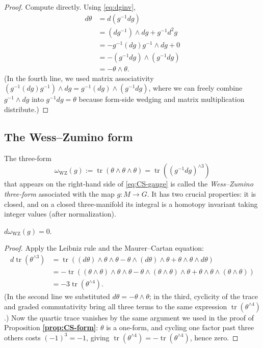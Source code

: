 \documentclass[11pt]{article}
\newcommand{\tr}{\operatorname{tr}}
\theoremstyle{definition}
\numberwithin{theorem}{section}
\numberwithin{equation}{section}
\begin{document}
\begin{proof}
Compute directly. Using \eqref{eq:dginv},
\begin{align*}
d\theta &= d(g^{-1}dg) \\
&= (dg^{-1})\wedge dg + g^{-1}d^2g \\
&= -g^{-1}(dg)g^{-1}\wedge dg + 0 \\
&= -(g^{-1}dg)\wedge(g^{-1}dg) \\
&= -\theta\wedge\theta.
\end{align*}
(In the fourth line, we used matrix associativity $(g^{-1}(dg)g^{-1})\wedge dg = g^{-1}(dg)\wedge(g^{-1}dg)$, where we can freely combine $g^{-1}\wedge dg$ into $g^{-1}dg = \theta$ because form-side wedging and matrix multiplication distribute.)
\end{proof}

\subsection{The Wess--Zumino form}

The three-form
\begin{equation}\label{eq:WZ-form}
\omega_{\text{WZ}}(g) := \tr(\theta\wedge\theta\wedge\theta) = \tr\left((g^{-1}dg)^{\wedge 3}\right)
\end{equation}
that appears on the right-hand side of \eqref{eq:CS-gauge} is called the \emph{Wess--Zumino three-form} associated with the map $g:M\to G$. It has two crucial properties: it is closed, and on a closed three-manifold its integral is a homotopy invariant taking integer values (after normalization).

\begin{lemma}\label{lem:WZ-closed}
$d\omega_{\text{WZ}}(g) = 0$.
\end{lemma}

\begin{proof}
Apply the Leibniz rule and the Maurer--Cartan equation:
\begin{align*}
d\tr(\theta^{\wedge 3}) &= \tr\left((d\theta)\wedge\theta\wedge\theta - \theta\wedge(d\theta)\wedge\theta + \theta\wedge\theta\wedge d\theta\right) \\
&= -\tr\left((\theta\wedge\theta)\wedge\theta\wedge\theta - \theta\wedge(\theta\wedge\theta)\wedge\theta + \theta\wedge\theta\wedge(\theta\wedge\theta)\right) \\
&= -3\tr(\theta^{\wedge 4}).
\end{align*}
(In the second line we substituted $d\theta = -\theta\wedge\theta$; in the third, cyclicity of the trace and graded commutativity bring all three terms to the same expression $\tr(\theta^{\wedge 4})$.) Now the quartic trace vanishes by the same argument we used in the proof of Proposition \textbf{\ref{prop:CS-form}}: $\theta$ is a one-form, and cycling one factor past three others costs $(-1)^3 = -1$, giving $\tr(\theta^{\wedge 4}) = -\tr(\theta^{\wedge 4})$, hence zero.
\end{proof}
\end{document}
